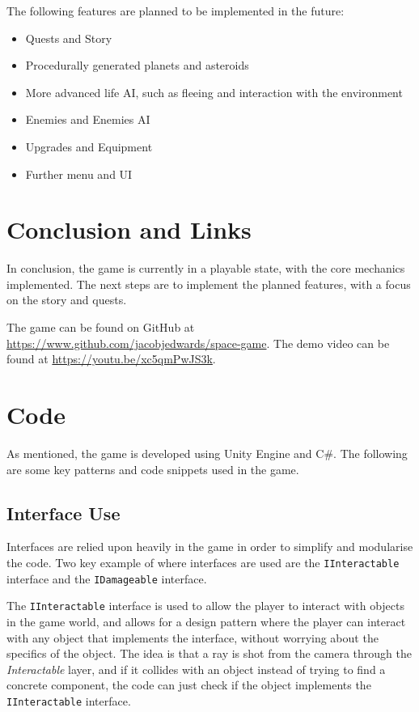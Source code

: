 \documentclass[final]{cmpreport}
\begin{document}
    The following features are planned to be implemented in the future:

    \begin{itemize}[noitemsep]
        \item Quests and Story
        \item Procedurally generated planets and asteroids
        \item More advanced life AI, such as fleeing and interaction with the environment
        \item Enemies and Enemies AI
        \item Upgrades and Equipment
        \item Further menu and UI
    \end{itemize}

    \section{Conclusion and Links}\label{sec:conclusion}

    In conclusion, the game is currently in a playable state, with the core mechanics implemented.
    The next steps are to implement the planned features, with a focus on the story and quests.

    The game can be found on GitHub at \url{https://www.github.com/jacobjedwards/space-game}.
    The demo video can be found at \url{https://youtu.be/xc5qmPwJS3k}.


    

    \appendix

    \section{Code}\label{sec:code}

    As mentioned, the game is developed using Unity Engine and C\#.
    The following are some key patterns and code snippets used in the game.

    \subsection{Interface Use}\label{subsec:interface}

    Interfaces are relied upon heavily in the game in order to simplify and modularise the code.
    Two key example of where interfaces are used are the \texttt{IInteractable} interface and the
    \texttt{IDamageable} interface.

    The \texttt{IInteractable} interface is used to allow the player to interact with objects in the game world, and
    allows for a design pattern where the player can interact with any object that implements the interface, without
    worrying about the specifics of the object.
    The idea is that a ray is shot from the camera through the \textit{Interactable} layer, and if it collides with
    an object instead of trying to find a concrete component, the code can just check if the object implements the
    \texttt{IInteractable} interface.
\end{document}

